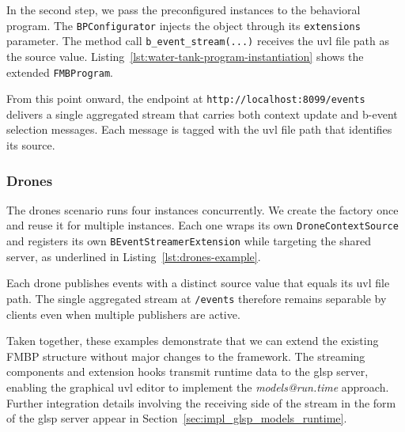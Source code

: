 

In the second step, we pass the preconfigured instances to the behavioral program.
The \texttt{BPConfigurator} injects the object through its \texttt{extensions} parameter.
The method call \texttt{b\_event\_stream(...)} receives the \gls{uvl} file path as the source value.
Listing~\ref{lst:water-tank-program-instantiation} shows the extended \texttt{FMBProgram}.
 
From this point onward, the endpoint at \texttt{http://localhost:8099/events} delivers a single aggregated stream that carries both context update and b-event selection messages.
Each message is tagged with the \gls{uvl} file path that identifies its source.



\subsubsection{Drones}
\label{subsubsec:impl_fmbp_examples_drones}
 
The drones scenario runs four instances concurrently.
We create the factory once and reuse it for multiple instances.
Each one wraps its own \texttt{DroneContextSource} and registers its own \texttt{BEventStreamerExtension} while targeting the shared server, as underlined in Listing~\ref{lst:drones-example}.
 

 
Each drone publishes events with a distinct source value that equals its \gls{uvl} file path.
The single aggregated stream at \texttt{/events} therefore remains separable by clients even when multiple publishers are active.

Taken together, these examples demonstrate that we can extend the existing FMBP structure without major changes to the framework.
The streaming components and extension hooks transmit runtime data to the \gls{glsp} server, enabling the graphical \gls{uvl} editor to implement the \textit{models@run.time} approach.
Further integration details involving the receiving side of the stream in the form of the \gls{glsp} server appear in Section~\ref{sec:impl_glsp_models_runtime}.